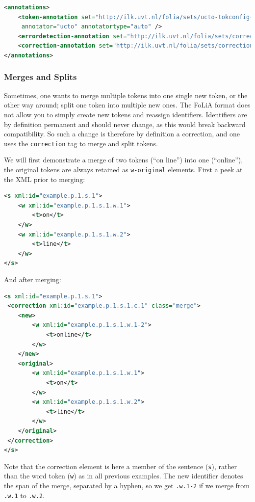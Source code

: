 \documentclass[a4paper,12pt]{report}
\begin{document}
\begin{lstlisting}[language=xml]
<annotations>
    <token-annotation set="http://ilk.uvt.nl/folia/sets/ucto-tokconfig-nl" 
     annotator="ucto" annotatortype="auto" />
    <errordetection-annotation set="http://ilk.uvt.nl/folia/sets/corrections" />
    <correction-annotation set="http://ilk.uvt.nl/folia/sets/corrections" />
</annotations>
\end{lstlisting}

\subsubsection{Merges and Splits} 

Sometimes, one wants to merge multiple tokens into one single new token, or the other way around; split one token into multiple new ones. The FoLiA format does not allow you to simply create new tokens and reassign identifiers. Identifiers are by definition permanent and should never change, as this would break backward compatibility. So such a change is therefore by definition a correction, and one uses the \texttt{correction} tag to merge and split tokens.

We will first demonstrate a merge of two tokens (``on line'') into one (``online''), the original tokens are always retained as \texttt{w-original} elements. First a peek at the XML prior to merging:

\begin{lstlisting}[language=xml]
<s xml:id="example.p.1.s.1">
    <w xml:id="example.p.1.s.1.w.1">
        <t>on</t>
    </w>
    <w xml:id="example.p.1.s.1.w.2">
        <t>line</t>
    </w>                       
</s>  
\end{lstlisting}

And after merging:

\begin{lstlisting}[language=xml]
<s xml:id="example.p.1.s.1">
 <correction xml:id="example.p.1.s.1.c.1" class="merge">
    <new>
        <w xml:id="example.p.1.s.1.w.1-2">        
            <t>online</t>
        </w>
    </new>
    <original>
        <w xml:id="example.p.1.s.1.w.1">
            <t>on</t>
        </w>
        <w xml:id="example.p.1.s.1.w.2">
            <t>line</t>
        </w>                         
    </original>
 </correction>               
</s>
\end{lstlisting} 

Note that the correction element is here a member of the sentence (\texttt{s}), rather than the word token (\texttt{w}) as in all previous examples. The new identifier denotes the span of the merge, separated by a hyphen, so we get \texttt{.w.1-2} if we merge from \texttt{.w.1} to \texttt{.w.2}.
\end{document}
